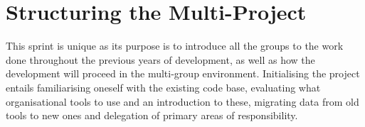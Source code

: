 \chapter{Structuring the Multi-Project}
This sprint is unique as its purpose is to introduce all the groups to the work done throughout the previous years of development, as well as how the development will proceed in the multi-group environment.
Initialising the project entails familiarising oneself with the existing code base, evaluating what organisational tools to use and an introduction to these, migrating data from old tools to new ones and delegation of primary areas of responsibility.